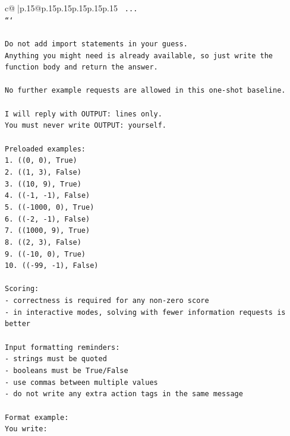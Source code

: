 \documentclass{article}
\begin{document}
{\begin{supertabular}{c@{$\;$}|p{.15\linewidth}@{}p{.15\linewidth}p{.15\linewidth}p{.15\linewidth}p{.15\linewidth}p{.15\linewidth}}
{{{\texttt{    ...} \\
\texttt{```} \\
\\ 
\texttt{Do not add import statements in your guess.} \\
\texttt{Anything you might need is already available, so just write the function body and return the answer.} \\
\\ 
\texttt{No further example requests are allowed in this one{-}shot baseline.} \\
\\ 
\texttt{I will reply with OUTPUT: lines only.} \\
\texttt{You must never write OUTPUT: yourself.} \\
\\ 
\texttt{Preloaded examples:} \\
\texttt{1. ((0, 0), True)} \\
\texttt{2. ((1, 3), False)} \\
\texttt{3. ((10, 9), True)} \\
\texttt{4. (({-}1, {-}1), False)} \\
\texttt{5. (({-}1000, 0), True)} \\
\texttt{6. (({-}2, {-}1), False)} \\
\texttt{7. ((1000, 9), True)} \\
\texttt{8. ((2, 3), False)} \\
\texttt{9. (({-}10, 0), True)} \\
\texttt{10. (({-}99, {-}1), False)} \\
\\ 
\texttt{Scoring:} \\
\texttt{{-} correctness is required for any non{-}zero score} \\
\texttt{{-} in interactive modes, solving with fewer information requests is better} \\
\\ 
\texttt{Input formatting reminders:} \\
\texttt{{-} strings must be quoted} \\
\texttt{{-} booleans must be True/False} \\
\texttt{{-} use commas between multiple values} \\
\texttt{{-} do not write any extra action tags in the same message} \\
\\ 
\texttt{Format example:} \\
\texttt{You write:} \\
}}}
\end{supertabular}}
\end{document}
